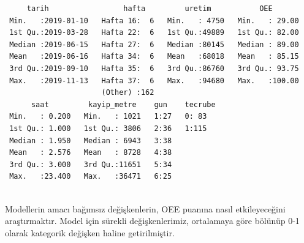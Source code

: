 \documentclass[12pt,twoside]{deuthesis}
\newenvironment{Shaded}{\begin{snugshade}}{\end{snugshade}}
\newcommand{\DecValTok}[1]{\textcolor[rgb]{0.00,0.00,0.81}{#1}}
\newcommand{\KeywordTok}[1]{\textcolor[rgb]{0.13,0.29,0.53}{\textbf{#1}}}
\newcommand{\NormalTok}[1]{#1}
\newcommand{\OperatorTok}[1]{\textcolor[rgb]{0.81,0.36,0.00}{\textbf{#1}}}
\begin{document}
\begin{verbatim}
     tarih                 hafta         uretim           OEE        
 Min.   :2019-01-10   Hafta 16:  6   Min.   : 4750   Min.   : 29.00  
 1st Qu.:2019-03-28   Hafta 22:  6   1st Qu.:49889   1st Qu.: 82.00  
 Median :2019-06-15   Hafta 27:  6   Median :80145   Median : 89.00  
 Mean   :2019-06-16   Hafta 34:  6   Mean   :68018   Mean   : 85.15  
 3rd Qu.:2019-09-10   Hafta 35:  6   3rd Qu.:86760   3rd Qu.: 93.75  
 Max.   :2019-11-13   Hafta 37:  6   Max.   :94680   Max.   :100.00  
                      (Other) :162                                   
      saat         kayip_metre    gun    tecrube
 Min.   : 0.200   Min.   : 1021   1:27   0: 83  
 1st Qu.: 1.000   1st Qu.: 3806   2:36   1:115  
 Median : 1.950   Median : 6943   3:38          
 Mean   : 2.576   Mean   : 8728   4:38          
 3rd Qu.: 3.000   3rd Qu.:11651   5:34          
 Max.   :23.400   Max.   :36471   6:25          
                                                
\end{verbatim}
Modellerin amacı bağımsız değişkenlerin, OEE puanına nasıl etkileyeceğini araştırmaktır. Model için sürekli değişkenlerimiz, ortalamaya göre bölünüp 0-1 olarak kategorik değişken haline getirilmiştir.
\begin{Shaded}
\end{Shaded}
\begin{Shaded}
\end{Shaded}
\end{document}
